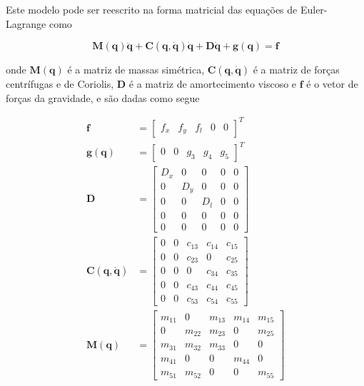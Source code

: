 \documentclass{ppgeesa}
\begin{document}
Este modelo pode ser reescrito na forma matricial das equações de Euler-Lagrange\cite{Siciliano2009} como

\begin{equation}
  \mathbf{M}(\mathbf{q})\ddot{\mathbf{q}}+\mathbf{C}(\mathbf{q}, \dot{\mathbf{q}})\dot{\mathbf{q}}+\mathbf{D}\dot{\mathbf{q}}+\mathbf{g}(\mathbf{q}) = \mathbf{f}\label{eq:matricial_euler_lagrange}
\end{equation}

\noindent onde $\mathbf{M}(\mathbf{q})$ é a matriz de massas simétrica, $\mathbf{C}(\mathbf{q}, \dot{\mathbf{q}})$ é a matriz de forças centrífugas e de Coriolis, $\mathbf{D}$ é a matriz de amortecimento viscoso e $\mathbf{f}$ é o vetor de forças da gravidade, e são dadas como segue\cite{Almutairi}

{\allowdisplaybreaks
\begin{align}
\mathbf{f} &= \begin{bmatrix} f_x & f_y & f_l & 0 & 0 \end{bmatrix}^T \\
\mathbf{g}(\mathbf{q}) &= \begin{bmatrix} 0 & 0 & g_3 & g_4 & g_5 \end{bmatrix}^T \\
\mathbf{D} &= \begin{bmatrix}
D_x & 0 & 0 & 0 & 0 \\
0 & D_y & 0 & 0 & 0 \\
0 & 0 & D_l & 0 & 0 \\
0 & 0 & 0 & 0 & 0 \\
0 & 0 & 0 & 0 & 0
\end{bmatrix} \\
\mathbf{C}(\mathbf{q}, \dot{\mathbf{q}}) &= \begin{bmatrix}
0 & 0 & c_{13} & c_{14} & c_{15} \\
0 & 0 & c_{23} & 0 & c_{25} \\
0 & 0 & 0 & c_{34} & c_{35} \\
0 & 0 & c_{43} & c_{44} & c_{45} \\
0 & 0 & c_{53} & c_{54} & c_{55}
\end{bmatrix} \\
\mathbf{M}(\mathbf{q}) &= \begin{bmatrix}
m_{11} & 0 & m_{13} & m_{14} & m_{15} \\
0 & m_{22} & m_{23} & 0 & m_{25} \\
m_{31} & m_{32} & m_{33} & 0 & 0 \\
m_{41} & 0 & 0 & m_{44} & 0 \\
m_{51} & m_{52} & 0 & 0 & m_{55}
\end{bmatrix}\label{eq:mass_matrix}
\end{align}
}
\end{document}
